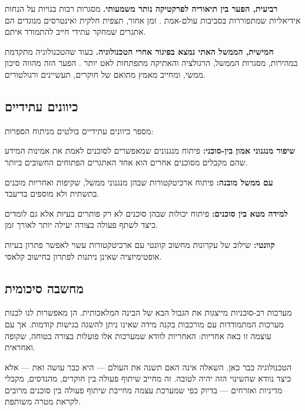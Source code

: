 \documentclass[12pt,a4paper]{article}
\begin{document}
\textbf{רביעית, הפער בין תיאוריה לפרקטיקה נותר משמעותי.} מסגרות  רבות בנויות על הנחות אידיאליות שמתפוררות בסביבות עולם-אמת \cite{ScienceDirect_AgentAI2025}. זמן אחור, תצפית חלקית ואינטרסים מנוגדים הם אתגרים שמחקר עתידי חייב להתמודד איתם.

\textbf{חמישית, הממשל האתי נמצא בפיגור אחרי הטכנולוגיה.} בעוד שהטכנולוגיה מתקדמת במהירות, מסגרות הממשל, הרגולציה והאתיקה מתפתחות לאט יותר \cite{WEF2024}. הפער הזה מהווה סיכון ממשי, ומחייב מאמץ מתואם של חוקרים, תעשיינים ורגולטורים.

\subsection{כיוונים עתידיים}

מספר כיוונים עתידיים בולטים מניתוח הספרות:

\textbf{שיפור מנגנוני אמון בין-סוכני:} פיתוח מנגנונים שמאפשרים לסוכנים לאמת את אמינות המידע שהם מקבלים מסוכנים אחרים הוא אחד האתגרים הפתוחים החשובים ביותר.

\textbf{ עם ממשל מובנה:} פיתוח ארכיטקטורות  שבהן מנגנוני ממשל, שקיפות ואחריות מובנים בתשתית ולא מוספים בדיעבד.

\textbf{למידה מטא בין סוכנים:} פיתוח יכולות שבהן סוכנים לא רק פותרים בעיות אלא גם לומדים כיצד לשתף פעולה בצורה יעילה יותר לאורך זמן.

\textbf{ קוונטי:} שילוב של עקרונות מחשוב קוונטי עם ארכיטקטורות  עשוי לאפשר פתרון בעיות אופטימיזציה שאינן ניתנות לפתרון בחישוב קלאסי.

\subsection{מחשבה סיכומית}

מערכות רב-סוכניות מייצגות את הגבול הבא של הבינה המלאכותית. הן מאפשרות לנו לבנות מערכות המתמודדות עם מורכבות בקנה מידה שאינו ניתן להשגה בגישות קודמות. אך עם עוצמה זו באה אחריות: האחריות לוודא שמערכות אלו פועלות בצורה בטוחה, שקופה ואחראית.

הטכנולוגיה כבר כאן. השאלה אינה האם  תשנה את העולם --- היא כבר עושה זאת --- אלא כיצד נוודא שהשינוי הזה יהיה לטובה. זה מחייב שיתוף פעולה בין חוקרים, מהנדסים, מקבלי מדיניות ואזרחים --- בדיוק כפי שמערכת  עצמה מחייבת שיתוף פעולה בין סוכנים מרובים לקראת מטרה משותפת.

\newpage

\begin{english}
\printbibliography[title={Bibliography}]
\end{english}
\end{document}
